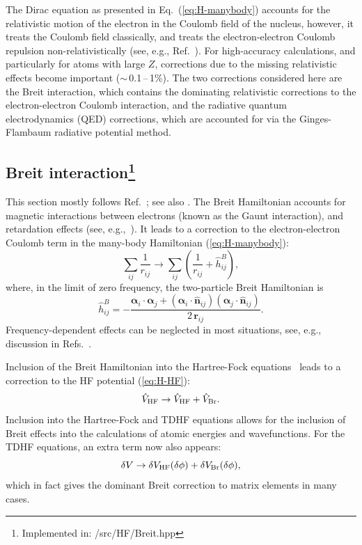 \documentclass[10pt,twocolumn,a4paper]{article}%
\renewcommand{\v}[1]{\ensuremath{\boldsymbol{#1}}}		%
\newcommand{\vhat}[1]{\ensuremath{\hat{\boldsymbol{#1}}}}		%
\newcommand{\be}{\begin{equation}}
\newcommand{\ee}{\end{equation}}
\renewcommand{\a}{\ensuremath{\alpha}}
\begin{document}
The Dirac equation as presented in Eq.~(\ref{eq:H-manybody})
accounts for the relativistic motion of the electron in the Coulomb field of the nucleus, however, it treats the Coulomb field classically, and treats the electron-electron Coulomb repulsion non-relativistically (see, e.g., Ref.~\cite{BetheBook}).
For high-accuracy calculations, and particularly for atoms with large $Z$, corrections due to the missing relativistic effects become important ($\sim$\,0.1\,--\,1\%).
The two corrections considered here are the
Breit interaction, which contains the dominating relativistic corrections to the electron-electron Coulomb interaction, and 
the radiative quantum electrodynamics (QED) corrections, which are accounted for via the Ginges-Flambaum radiative potential method.




\subsection[Breit interaction]{Breit interaction\footnote{Implemented in: /src/HF/Breit.hpp}}


This section mostly follows Ref.~\cite{JohnsonBook2007}; see also \cite{Johnson1988a,Mann1971,Derevianko2001}.
The Breit Hamiltonian accounts for magnetic interactions between electrons (known as the Gaunt interaction), and retardation effects (see, e.g.,~\cite{BetheBook}).
It leads to a correction to the electron-electron Coulomb term in the many-body Hamiltonian (\ref{eq:H-manybody}):
\be
\sum_{ij}\frac{1}{r_{ij}}
\to
\sum_{ij}\left( \frac{1}{r_{ij}} + \hat h^B_{ij}\right),
\ee
where, in the limit of zero frequency, the two-particle Breit Hamiltonian is
\be
\hat h^B_{ij} = - \frac{\v{\a}_i\cdot\v{\a}_j + (\v{\a}_i\cdot\vhat{n}_{ij})(\v{\a}_j\cdot\vhat{n}_{ij})}{2\, \v{r}_{ij}}.
\ee
Frequency-dependent effects can be neglected in most situations, see, e.g., discussion in Refs.~\cite{BetheBook,JohnsonBook2007}.

Inclusion of the Breit Hamiltonian into the Hartree-Fock equations~\cite{Derevianko2001} leads to a correction to the HF potential (\ref{eq:H-HF}):
\be
\hat V_{\rm HF} \to  \hat V_{\rm HF}  + \hat V_{\rm Br} .
\ee
Inclusion into the Hartree-Fock and TDHF equations allows for the inclusion of Breit effects into the calculations of atomic energies and wavefunctions.
For the TDHF equations, an extra term now also appears: 
\be
\delta V\to \delta V_{\rm HF}(\delta\phi)+\delta V_{\rm Br}(\delta\phi),
\ee
which in fact gives the dominant Breit correction to matrix elements in many cases.
\end{document}
